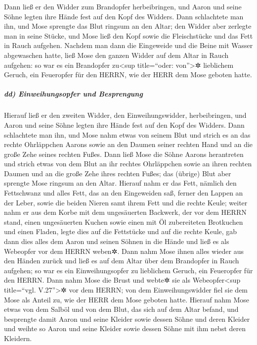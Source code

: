 Dann ließ er den Widder zum Brandopfer herbeibringen, und
Aaron und seine Söhne legten ihre Hände fest auf den Kopf des Widders.
Dann schlachtete man ihn, und Mose sprengte das Blut
ringsum an den Altar; den Widder aber zerlegte man in
seine Stücke, und Mose ließ den Kopf sowie die Fleischstücke und das
Fett in Rauch aufgehen. Nachdem man dann die Eingeweide
und die Beine mit Wasser abgewaschen hatte, ließ Mose den ganzen Widder
auf dem Altar in Rauch aufgehen: so war es ein Brandopfer
zu\textless sup title=``oder: von''\textgreater✲ lieblichem Geruch, ein
Feueropfer für den HERRN, wie der HERR dem Mose geboten hatte.

\hypertarget{dd-einweihungsopfer-und-besprengung}{%
\subparagraph{dd) Einweihungsopfer und
Besprengung}\label{dd-einweihungsopfer-und-besprengung}}

Hierauf ließ er den zweiten Widder, den
Einweihungswidder, herbeibringen, und Aaron und seine Söhne legten ihre
Hände fest auf den Kopf des Widders. Dann schlachtete man
ihn, und Mose nahm etwas von seinem Blut und strich es an das rechte
Ohrläppchen Aarons sowie an den Daumen seiner rechten Hand und an die
große Zehe seines rechten Fußes. Dann ließ Mose die Söhne
Aarons herantreten und strich etwas von dem Blut an ihr rechtes
Ohrläppchen sowie an ihren rechten Daumen und an die große Zehe ihres
rechten Fußes; das (übrige) Blut aber sprengte Mose ringsum an den
Altar. Hierauf nahm er das Fett, nämlich den Fettschwanz
und alles Fett, das an den Eingeweiden saß, ferner den Lappen an der
Leber, sowie die beiden Nieren samt ihrem Fett und die rechte Keule;
weiter nahm er aus dem Korbe mit dem ungesäuerten
Backwerk, der vor dem HERRN stand, einen ungesäuerten Kuchen sowie einen
mit Öl zubereiteten Brotkuchen und einen Fladen, legte dies auf die
Fettstücke und auf die rechte Keule, gab dann dies alles
dem Aaron und seinen Söhnen in die Hände und ließ es als Webeopfer vor
dem HERRN weben✲. Dann nahm Mose ihnen alles wieder aus
den Händen zurück und ließ es auf dem Altar über dem Brandopfer in Rauch
aufgehen; so war es ein Einweihungsopfer zu lieblichem Geruch, ein
Feueropfer für den HERRN. Dann nahm Mose die Brust und
webte✲ sie als Webeopfer\textless sup title=``vgl. V.27''\textgreater✲
vor dem HERRN; von dem Einweihungswidder fiel sie dem Mose als Anteil
zu, wie der HERR dem Mose geboten hatte. Hierauf nahm
Mose etwas von dem Salböl und von dem Blut, das sich auf dem Altar
befand, und besprengte damit Aaron und seine Kleider sowie dessen Söhne
und deren Kleider und weihte so Aaron und seine Kleider sowie dessen
Söhne mit ihm nebst deren Kleidern.

